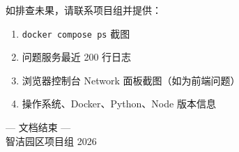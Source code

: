 \documentclass[UTF8,a4paper,11pt]{ctexart}
\begin{document}
\vspace{1em}
\begin{infobox}[技术支持]
如排查未果，请联系项目组并提供：
\begin{enumerate}[leftmargin=1.4em,itemsep=1pt]
  \item \texttt{docker compose ps} 截图
  \item 问题服务最近 200 行日志
  \item 浏览器控制台 Network 面板截图（如为前端问题）
  \item 操作系统、Docker、Python、Node 版本信息
\end{enumerate}
\end{infobox}

\vspace{2em}
\begin{center}
\color{gray}\small --- 文档结束 ---\\[2pt]
智洁园区项目组 \textperiodcentered{} 2026
\end{center}
\end{document}
